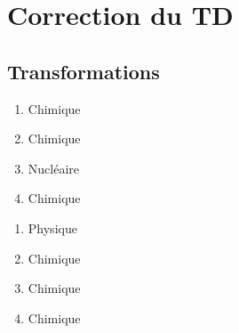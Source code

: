 \documentclass[a4paper, 12pt, final, garamond]{book}
\begin{document}
\setcounter{chapter}{1}

\chapter{Correction du TD}

\section{Transformations}

\begin{minipage}{0.40\linewidth}
    \begin{enumerate}
        \item Chimique
        \item Chimique
        \item Nucléaire
        \item Chimique
    \end{enumerate}
\end{minipage}
\hfill
\begin{minipage}{0.60\linewidth}
    \begin{enumerate}[start=5]
        \item Physique
        \item Chimique
        \item Chimique
        \item Chimique
    \end{enumerate}
\end{minipage}
\end{document}
